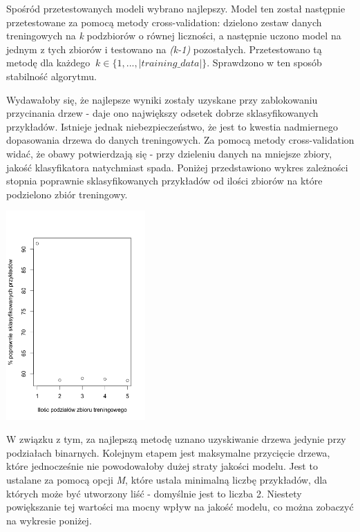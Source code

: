\documentclass[11pt]{article} %
\begin{document}
Spośród przetestowanych modeli wybrano najlepszy. Model ten został następnie przetestowane za pomocą metody cross-validation: dzielono zestaw danych treningowych na \emph{k} podzbiorów o równej liczności, a następnie uczono model na jednym z tych zbiorów i testowano na \emph{(k-1)} pozostałych. Przetestowano tą metodę dla każdego $\ k \in \{1, ..., |training\_data|\} $. Sprawdzono w ten sposób stabilność algorytmu.

Wydawałoby się, że najlepsze wyniki zostały uzyskane przy zablokowaniu przycinania drzew - daje ono największy odsetek dobrze sklasyfikowanych przykładów. Istnieje jednak niebezpieczeństwo, że jest to kwestia nadmiernego dopasowania drzewa do danych treningowych. Za pomocą metody cross-validation widać, że obawy potwierdzają się - przy dzieleniu danych na mniejsze zbiory, jakość klasyfikatora natychmiast spada. Poniżej przedstawiono wykres zależności stopnia poprawnie sklasyfikowanych przykładów od ilości zbiorów na które podzielono zbiór treningowy.

\begin{center}
	\includegraphics[height=8cm]{unprunned-overfitting}
\end{center}

W związku z tym, za najlepszą metodę uznano uzyskiwanie drzewa jedynie przy podziałach binarnych. Kolejnym etapem jest maksymalne przycięcie drzewa, które jednocześnie nie powodowałoby dużej straty jakości modelu. Jest to ustalane za pomocą opcji \emph{M}, które ustala minimalną liczbę przykładów, dla których może być utworzony liść - domyślnie jest to liczba 2. Niestety powiększanie tej wartości ma mocny wpływ na jakość modelu, co można zobaczyć na wykresie poniżej.
\end{document}
